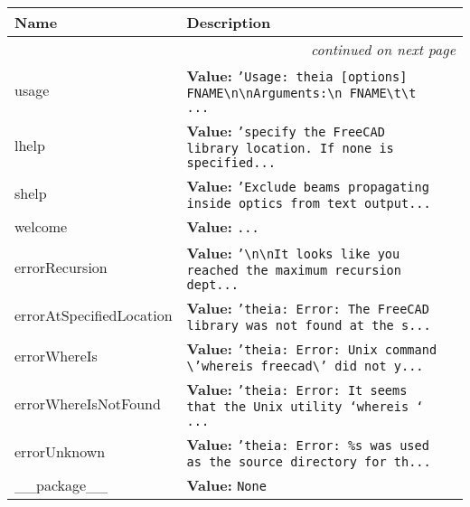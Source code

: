     \vspace{-1cm}
\hspace{\varindent}\begin{longtable}{|p{\varnamewidth}|p{\vardescrwidth}|l}
\cline{1-2}
\cline{1-2} \centering \textbf{Name} & \centering \textbf{Description}& \\
\cline{1-2}
\endhead\cline{1-2}\multicolumn{3}{r}{\small\textit{continued on next page}}\\\endfoot\cline{1-2}
\endlastfoot\raggedright u\-s\-a\-g\-e\- & \raggedright \textbf{Value:} 
{\tt \texttt{'}\texttt{Usage: theia [options] FNAME{\textbackslash}n{\textbackslash}nArguments:{\textbackslash}n  FNAME{\textbackslash}t{\textbackslash}t }\texttt{...}}&\\
\cline{1-2}
\raggedright l\-h\-e\-l\-p\- & \raggedright \textbf{Value:} 
{\tt \texttt{'}\texttt{specify the FreeCAD library location. If none is specified}\texttt{...}}&\\
\cline{1-2}
\raggedright s\-h\-e\-l\-p\- & \raggedright \textbf{Value:} 
{\tt \texttt{'}\texttt{Exclude beams propagating inside optics from text output}\texttt{...}}&\\
\cline{1-2}
\raggedright w\-e\-l\-c\-o\-m\-e\- & \raggedright \textbf{Value:} 
{\tt \texttt{...}}&\\
\cline{1-2}
\raggedright e\-r\-r\-o\-r\-R\-e\-c\-u\-r\-s\-i\-o\-n\- & \raggedright \textbf{Value:} 
{\tt \texttt{'}\texttt{{\textbackslash}n{\textbackslash}nIt looks like you reached the maximum recursion dept}\texttt{...}}&\\
\cline{1-2}
\raggedright e\-r\-r\-o\-r\-A\-t\-S\-p\-e\-c\-i\-f\-i\-e\-d\-L\-o\-c\-a\-t\-i\-o\-n\- & \raggedright \textbf{Value:} 
{\tt \texttt{'}\texttt{theia: Error: The FreeCAD library was not found at the s}\texttt{...}}&\\
\cline{1-2}
\raggedright e\-r\-r\-o\-r\-W\-h\-e\-r\-e\-I\-s\- & \raggedright \textbf{Value:} 
{\tt \texttt{'}\texttt{theia: Error: Unix command {\textbackslash}'whereis freecad{\textbackslash}' did not y}\texttt{...}}&\\
\cline{1-2}
\raggedright e\-r\-r\-o\-r\-W\-h\-e\-r\-e\-I\-s\-N\-o\-t\-F\-o\-u\-n\-d\- & \raggedright \textbf{Value:} 
{\tt \texttt{'}\texttt{theia: Error: It seems that the Unix utility `whereis ` }\texttt{...}}&\\
\cline{1-2}
\raggedright e\-r\-r\-o\-r\-U\-n\-k\-n\-o\-w\-n\- & \raggedright \textbf{Value:} 
{\tt \texttt{'}\texttt{theia: Error: \%s was used as the source directory for th}\texttt{...}}&\\
\cline{1-2}
\raggedright \_\-\_\-p\-a\-c\-k\-a\-g\-e\-\_\-\_\- & \raggedright \textbf{Value:} 
{\tt None}&\\
\cline{1-2}
\end{longtable}

